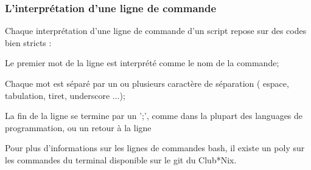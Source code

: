 \subsubsection{L'interprétation d'une ligne de commande}

Chaque interprétation d'une ligne de commande d'un script repose sur des codes bien stricts :
\begin{itemiz}
  \item Le premier mot de la ligne est interprété comme le nom de la commande;
  \item Chaque mot est séparé par un ou plusieurs caractère de séparation ( espace, tabulation, tiret, underscore ...);
  \item La fin de la ligne se termine par un ';', comme dans la plupart des languages de programmation, ou un retour à la ligne
\end{itemiz}


Pour plus d'informations sur les lignes de commandes bash, il existe un poly sur les commandes du terminal disponible sur le git du Club*Nix.
